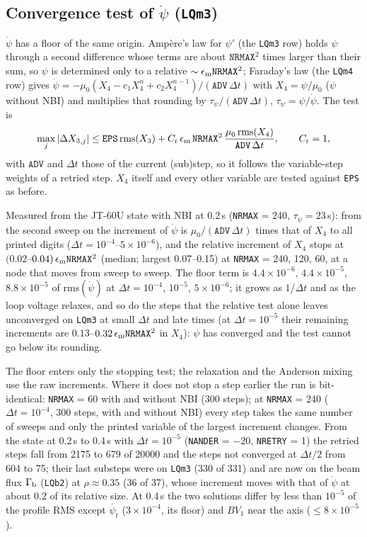 \documentclass[11pt]{article}
\def\r#1{{\rm#1}}
\def\psid{\dot{\psi}}
\def\psit{\psi_t}
\def\psitd{\dot{\psit}}
\begin{document}
\subsection{Convergence test of $\psid$ (\texttt{LQm3})}
\label{sec:lqm3tol}

$\psid$ has a floor of the same origin.  Amp\`ere's law for $\psi'$ (the
\texttt{LQm3} row) holds $\psi$ through a second difference whose terms are about
$\texttt{NRMAX}^2$ times larger than their sum, so $\psi$ is determined only to a
relative $\sim\epsilon_\r{m}\texttt{NRMAX}^2$; Faraday's law (the \texttt{LQm4} row)
gives $\psid = -\mu_0(X_4 - c_1X_4^{n} + c_2X_4^{n-1})/(\texttt{ADV}\,\Delta t)$ with
$X_4 = \psi/\mu_0$ ($\psi$ without NBI) and multiplies that rounding by
$\tau_\psi/(\texttt{ADV}\,\Delta t)$, $\tau_\psi = \psi/\psid$.  The test is
\[
  \max_j|\Delta X_{3,j}| \le \texttt{EPS}\,\mathrm{rms}(X_3)
  + C_\r{r}\,\epsilon_\r{m}\,\texttt{NRMAX}^2\,
    \frac{\mu_0\,\mathrm{rms}(X_4)}{\texttt{ADV}\,\Delta t},
  \qquad C_\r{r} = 1,
\]
with $\texttt{ADV}$ and $\Delta t$ those of the current (sub)step, so it follows the
variable-step weights of a retried step.  $X_4$ itself and every other variable are
tested against \texttt{EPS} as before.

Measured from the JT-60U state with NBI at 0.2\,s (\texttt{NRMAX} = 240,
$\tau_\psi = 23$\,s): from the second sweep on the increment of $\psid$ is
$\mu_0/(\texttt{ADV}\,\Delta t)$ times that of $X_4$ to all printed digits
($\Delta t = 10^{-4}$--$5\times10^{-6}$), and the relative increment of $X_4$ stops at
$(0.02$--$0.04)\,\epsilon_\r{m}\texttt{NRMAX}^2$ (median; largest 0.07--0.15) at
\texttt{NRMAX} = 240, 120, 60, at a node that moves from sweep to sweep.  The floor
term is $4.4\times10^{-6}$, $4.4\times10^{-5}$, $8.8\times10^{-5}$ of
$\mathrm{rms}(\psid)$ at $\Delta t = 10^{-4}$, $10^{-5}$, $5\times10^{-6}$; it grows as
$1/\Delta t$ and as the loop voltage relaxes, and so do the steps that the relative
test alone leaves unconverged on \texttt{LQm3} at small $\Delta t$ and late times
(at $\Delta t = 10^{-5}$ their remaining increments are $0.13$--$0.32\,\epsilon_\r{m}
\texttt{NRMAX}^2$ in $X_4$): $\psi$ has converged and the test cannot go below
its rounding.

The floor enters only the stopping test; the relaxation and the Anderson
mixing use the raw increments.  Where it does not stop a step earlier the run
is bit-identical: \texttt{NRMAX} = 60 with and without NBI (300 steps); at
\texttt{NRMAX} = 240 ($\Delta t = 10^{-4}$, 300 steps, with and without NBI) every
step takes the same number of sweeps and only the printed variable of the
largest increment changes.  From the state at 0.2\,s to 0.4\,s with
$\Delta t = 10^{-5}$ (\texttt{NANDER} = $-20$, \texttt{NRETRY} = 1) the retried
steps fall from 2175 to 679 of 20000 and the steps not converged at $\Delta t/2$
from 604 to 75; their last substeps were on \texttt{LQm3} (330 of 331) and are
now on the beam flux $\Gamma_\r{b}$ (\texttt{LQb2}) at $\rho\approx0.35$ (36 of 37),
whose increment moves with that of $\psid$ at about 0.2 of its relative size.
At 0.4\,s the two solutions differ by less than $10^{-5}$ of the profile RMS
except $\psitd$ ($3\times10^{-4}$, its floor) and $BV_1$ near the axis
($\le 8\times10^{-5}$).
\end{document}
